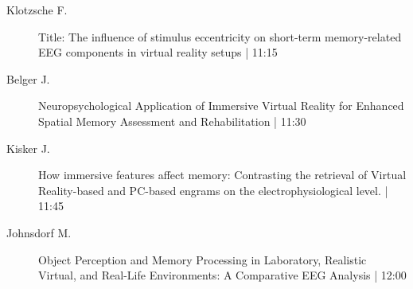 \begin{symposium}
\begin{description}
                \item [ Klotzsche F.] Title: The influence of stimulus eccentricity on short-term memory-related EEG components in virtual reality setups \textcolor{mygray}{ | 11:15}    
                
                \item [ Belger J.] Neuropsychological Application of Immersive Virtual Reality for Enhanced Spatial Memory Assessment and Rehabilitation \textcolor{mygray}{ | 11:30}    
                
                \item [ Kisker J.] How immersive features affect memory: Contrasting the retrieval of Virtual Reality-based and PC-based engrams on the electrophysiological level. \textcolor{mygray}{ | 11:45}    
                
                \item [ Johnsdorf M.] Object Perception and Memory Processing in Laboratory, Realistic Virtual, and Real-Life Environments: A Comparative EEG Analysis \textcolor{mygray}{ | 12:00}    
                
            \end{description} 
            \end{symposium}
            